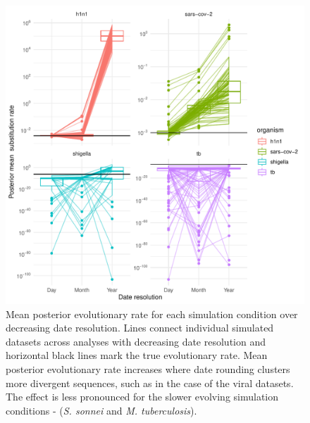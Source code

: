 \documentclass{article}
\begin{document}
\begin{spacing}{1.5}
\begin{figure}
    \centering
    \includegraphics{sim_clock_trajectory.pdf}
    \caption{Mean posterior evolutionary rate for each simulation condition over decreasing date resolution. Lines connect individual simulated datasets across analyses with decreasing date resolution and horizontal black lines mark the true evolutionary rate. Mean posterior evolutionary rate increases where date rounding clusters more divergent sequences, such as in the case of the viral datasets. The effect is less pronounced for the slower evolving simulation conditions - (\textit{S. sonnei} and \textit{M. tuberculosis}).}
    \label{fig:simClock}
\end{figure}


\end{spacing}
\end{document}
